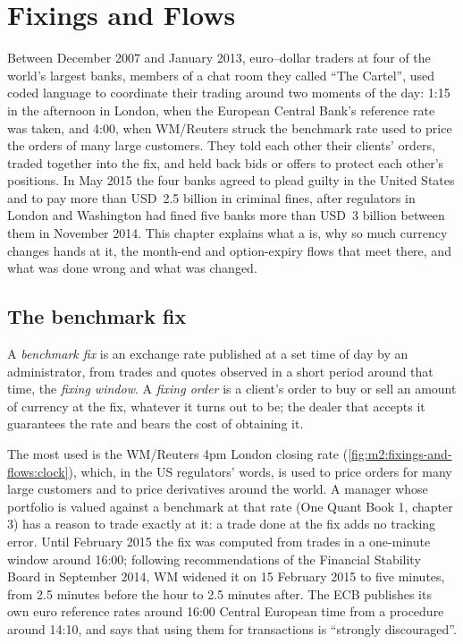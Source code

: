 \chapter{Fixings and Flows}\label{ch:m2:fixings-and-flows}

Between December 2007 and January 2013, euro--dollar traders at four of the
world's largest banks, members of a chat room they called ``The Cartel'', used
coded language to coordinate their trading around two moments of the day: 1:15
in the afternoon in London, when the European Central Bank's reference rate was
taken, and 4:00, when WM/Reuters struck the benchmark rate used to price the
orders of many large customers. They
told each other their clients' orders, traded together into the fix, and held
back bids or offers to protect each other's positions. In May 2015 the four
banks agreed to plead guilty in the United States and to pay more than USD~2.5
billion in criminal fines, after regulators in London and Washington had fined
five banks more than USD~3 billion between them in November 2014. This chapter
explains what a  is, why so much currency changes hands at it, the
month-end and option-expiry flows that meet there, and what was done wrong and
what was changed.

\section{The benchmark fix}

\begin{definition}\label{def:m2:fixings-and-flows:fix}
A \emph{benchmark fix} is an exchange rate published at a
set time of day by an administrator, from trades and quotes observed in a short
period around that time, the \emph{fixing window}. A
\emph{fixing order} is a client's order to buy or sell an
amount of currency at the fix, whatever it turns out to be; the dealer that
accepts it guarantees the rate and bears the cost of obtaining it.
\end{definition}

The most used is the WM/Reuters 4pm London closing rate
(\cref{fig:m2:fixings-and-flows:clock}), which, in the US
regulators' words, is used to price orders for many large customers and to price
derivatives around the world. A manager whose portfolio is valued against a
benchmark at that rate (One Quant Book 1, chapter 3) has a reason to trade
exactly at it: a trade done at the fix adds no tracking error. Until
February 2015 the fix was computed from trades in a one-minute window around
16:00; following recommendations of the Financial Stability Board in September
2014, WM widened it on 15 February 2015 to five minutes, from 2.5 minutes before
the hour to 2.5 minutes after. The ECB publishes its own euro reference rates
around 16:00 Central European time from a procedure around 14:10, and says that
using them for transactions is ``strongly discouraged''.

